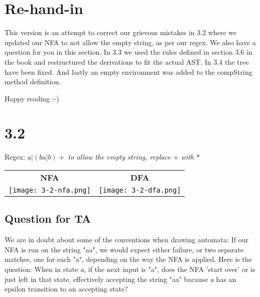 \documentclass{article}
\begin{document}
\section*{Re-hand-in}
This version is an attempt to correct our grievous mistakes in 3.2 where we updated our NFA to not allow the empty string, as per our regex. We also have a question for you in this section. 
In 3.3 we used the rules defined in section 3.6 in the book and restructured the derivations to fit the actual AST.
In 3.4 the tree have been fixed. And lastly an empty environment was added to the compString method definition.

Happy reading :-)

\section*{3.2}

Regex: $a|(ba|b)+$
\newline\textit{to allow the empty string, replace $+$ with $*$}

\vspace{10 mm}

\begin{tabular}{c c}
\textbf{NFA} & \textbf{DFA} \\
\texttt{[image: 3-2-nfa.png]} &
	\texttt{[image: 3-2-dfa.png]}
\end{tabular}
\subsection*{Question for TA}
We are in doubt about some of the conventions when drawing automata:
If our NFA is run on the string "aa", we would expect either failure, or
two separate matches, one for each "a", depending on the way the NFA is applied.
Here is the question: When in state \emph{a}, if the next input is "a", does the
NFA 'start over' or is just left in that state, effectively accepting the string
"aa" bacause \emph{a} has an epsilon transition to an accepting state?
\end{document}
